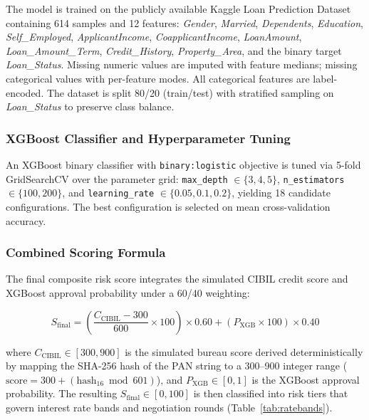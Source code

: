 \documentclass[conference]{IEEEtran}
\begin{document}
The model is trained on the publicly available Kaggle
Loan Prediction Dataset containing 614 samples and
12 features: \textit{Gender}, \textit{Married},
\textit{Dependents}, \textit{Education},
\textit{Self\_Employed}, \textit{ApplicantIncome},
\textit{CoapplicantIncome}, \textit{LoanAmount},
\textit{Loan\_Amount\_Term}, \textit{Credit\_History},
\textit{Property\_Area}, and the binary target
\textit{Loan\_Status}. Missing numeric values are
imputed with feature medians; missing categorical
values with per-feature modes. All categorical
features are label-encoded. The dataset is split
80/20 (train/test) with stratified sampling on
\textit{Loan\_Status} to preserve class balance.

\subsubsection{XGBoost Classifier and Hyperparameter Tuning}

An XGBoost binary classifier with \texttt{binary:logistic}
objective is tuned via 5-fold GridSearchCV over the
parameter grid: \texttt{max\_depth} $\in \{3, 4, 5\}$,
\texttt{n\_estimators} $\in \{100, 200\}$, and
\texttt{learning\_rate} $\in \{0.05, 0.1, 0.2\}$,
yielding 18 candidate configurations. The best
configuration is selected on mean cross-validation
accuracy.

\subsubsection{Combined Scoring Formula}

The final composite risk score integrates the simulated
CIBIL credit score and XGBoost approval probability
under a 60/40 weighting:

\begin{equation}
S_{\text{final}} = \left(\frac{C_{\text{CIBIL}} - 300}{600}
  \times 100\right) \times 0.60
  + \left(P_{\text{XGB}} \times 100\right) \times 0.40
\label{eq:score}
\end{equation}

\noindent where $C_{\text{CIBIL}} \in [300, 900]$ is the
simulated bureau score derived deterministically by mapping
the SHA-256 hash of the PAN string to a 300--900 integer
range ($\text{score} = 300 + (\text{hash}_{16} \bmod 601)$),
and $P_{\text{XGB}} \in [0, 1]$ is the XGBoost approval
probability. The resulting $S_{\text{final}} \in [0, 100]$
is then classified into risk tiers that govern interest
rate bands and negotiation rounds (Table~\ref{tab:ratebands}).
\end{document}
